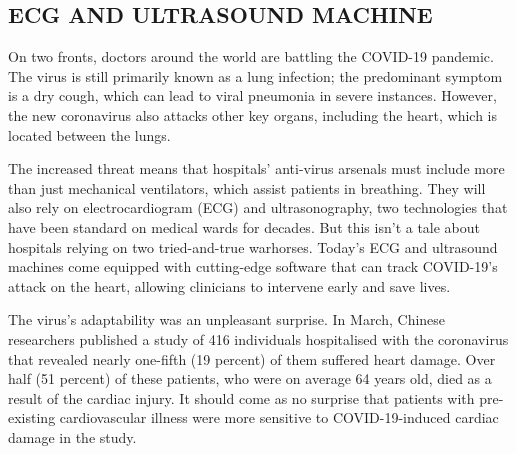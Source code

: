 \documentclass{article}
\begin{document}
\subsection{ECG AND ULTRASOUND MACHINE}

On two fronts, doctors around the world are battling the COVID-19 pandemic.
The virus is still primarily known as a lung infection; the predominant symptom is a dry cough, which can lead to viral pneumonia in severe instances.
However, the new coronavirus also attacks other key organs, including the heart, which is located between the lungs.


The increased threat means that hospitals' anti-virus arsenals must include more than just mechanical ventilators, which assist patients in breathing.
They will also rely on electrocardiogram (ECG) and ultrasonography, two technologies that have been standard on medical wards for decades.
But this isn't a tale about hospitals relying on two tried-and-true warhorses.
Today's ECG and ultrasound machines come equipped with cutting-edge software that can track COVID-19's attack on the heart, allowing clinicians to intervene early and save lives.


The virus's adaptability was an unpleasant surprise.
In March, Chinese researchers published a study of 416 individuals hospitalised with the coronavirus that revealed nearly one-fifth (19 percent) of them suffered heart damage.
Over half (51 percent) of these patients, who were on average 64 years old, died as a result of the cardiac injury.
It should come as no surprise that patients with pre-existing cardiovascular illness were more sensitive to COVID-19-induced cardiac damage in the study.

%
%
\end{document}
